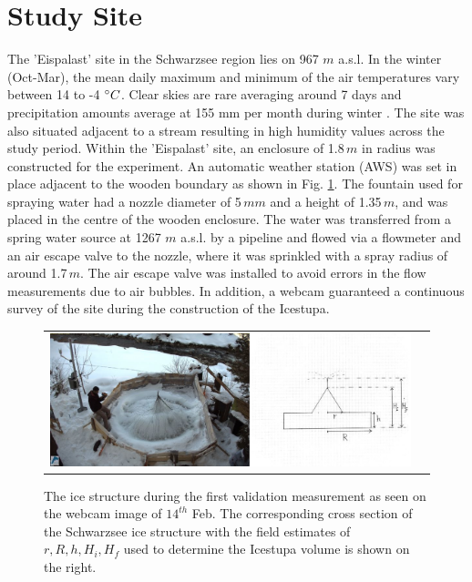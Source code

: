 \documentclass[utf8]{frontiersSCNS} %
\begin{document}
\section{Study Site}
The 'Eispalast' site in the Schwarzsee region lies on 967 $m$ a.s.l. In the
winter (Oct-Mar), the mean daily maximum and minimum of the air temperatures
vary between 14 to -4 $\degree C$. Clear skies are rare averaging around 7
days and precipitation amounts average at 155 mm per month during winter
\citep{eispalast}. The site was also situated adjacent to a stream resulting
in high humidity values across the study period. Within the 'Eispalast' site,
an enclosure of 1.8\,$m$ in radius was constructed for the experiment. An
automatic weather station (AWS) was set in place adjacent to the wooden
boundary as shown in Fig. \ref{fig:site}. The fountain used for spraying water
had a nozzle diameter of 5\,$mm$ and a height of 1.35\,$m$, and was placed in
the centre of the wooden enclosure. The water was transferred from a spring
water source at 1267 $m$ a.s.l. by a pipeline and flowed via a flowmeter and
an air escape valve to the nozzle, where it was sprinkled with a spray radius
of around 1.7\,$m$. The air escape valve was installed to avoid errors in the
flow measurements due to air bubbles. In addition, a webcam guaranteed a
continuous survey of the site during the construction of the Icestupa. 

\begin{figure}[htb]
\centering
  \begin{tabular}{@{}cc@{}}
    \includegraphics[width=15cm]{./Figures/Figure_2.jpg} &
  \end{tabular}
  \caption{The ice structure during the first validation measurement as seen on the webcam image of $14^{th}$ Feb. The corresponding cross section of the Schwarzsee ice structure with the field estimates of $r, R, h, H_i, H_f$ used to determine the Icestupa volume is shown on the right.}
  \label{fig:site}
\end{figure}
\end{document}

